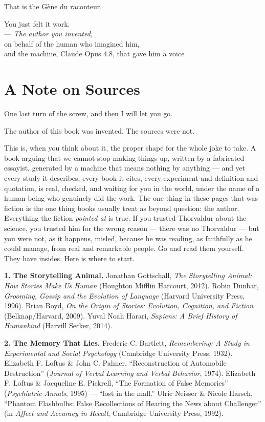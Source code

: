 That is the Gène du raconteur.

You just felt it work. \\
— \emph{The author you invented,} \\
on behalf of the human who imagined him, \\
and the machine, Claude Opus 4.8, that gave him a voice


\chapter*{A Note on Sources}
{} %
\label{sec:noteonsources}

One last turn of the screw, and then I will let you go.

The author of this book was invented. The sources were not.

This is, when you think about it, the proper shape for the whole joke to take. A book arguing that we cannot stop making things up, written by a fabricated essayist, generated by a machine that means nothing by anything — and yet every study it describes, every book it cites, every experiment and definition and quotation, is real, checked, and waiting for you in the world, under the name of a human being who genuinely did the work. The one thing in these pages that was fiction is the one thing books usually treat as beyond question: the author. Everything the fiction \emph{pointed at} is true. If you trusted Thorvaldur about the science, you trusted him for the wrong reason — there was no Thorvaldur — but you were not, as it happens, misled, because he was reading, as faithfully as he could manage, from real and remarkable people. Go and read them yourself. They have insides. Here is where to start.

\textbf{1. The Storytelling Animal.} Jonathan Gottschall, \emph{The Storytelling Animal: How Stories Make Us Human} (Houghton Mifflin Harcourt, 2012). Robin Dunbar, \emph{Grooming, Gossip and the Evolution of Language} (Harvard University Press, 1996). Brian Boyd, \emph{On the Origin of Stories: Evolution, Cognition, and Fiction} (Belknap/Harvard, 2009). Yuval Noah Harari, \emph{Sapiens: A Brief History of Humankind} (Harvill Secker, 2014).

\textbf{2. The Memory That Lies.} Frederic C. Bartlett, \emph{Remembering: A Study in Experimental and Social Psychology} (Cambridge University Press, 1932). Elizabeth F. Loftus \& John C. Palmer, ``Reconstruction of Automobile Destruction'' (\emph{Journal of Verbal Learning and Verbal Behavior}, 1974). Elizabeth F. Loftus \& Jacqueline E. Pickrell, ``The Formation of False Memories'' (\emph{Psychiatric Annals}, 1995) — ``lost in the mall.'' Ulric Neisser \& Nicole Harsch, ``Phantom Flashbulbs: False Recollections of Hearing the News about Challenger'' (in \emph{Affect and Accuracy in Recall}, Cambridge University Press, 1992).

